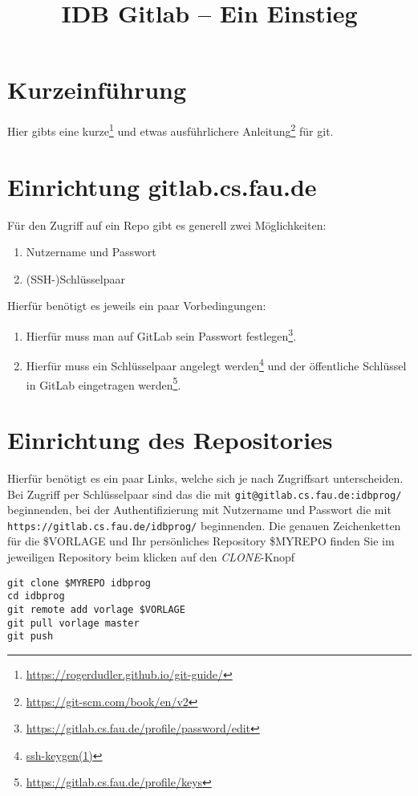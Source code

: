 \documentclass[10pt,a4paper]{article}
\begin{document}
\title{IDB Gitlab -- Ein Einstieg}
\date{}
\maketitle
\section{Kurzeinführung}
Hier gibts eine kurze\footnote{\url{https://rogerdudler.github.io/git-guide/}}
und etwas ausführlichere Anleitung\footnote{\url{https://git-scm.com/book/en/v2}}
für git.
\section{Einrichtung gitlab.cs.fau.de}
Für den Zugriff auf ein Repo gibt es generell zwei Möglichkeiten:
\begin{enumerate}
\item Nutzername und Passwort
\item (SSH-)Schlüsselpaar
\end{enumerate}
Hierfür benötigt es jeweils ein paar Vorbedingungen:
\begin{enumerate}
\item Hierfür muss man auf GitLab sein Passwort festlegen\footnote{\url{https://gitlab.cs.fau.de/profile/password/edit}}.
\item Hierfür muss ein Schlüsselpaar angelegt werden\footnote{\href{https://linux.die.net/man/1/ssh-keygen}{ssh-keygen(1)}} und der öffentliche Schlüssel in GitLab eingetragen werden\footnote{\url{https://gitlab.cs.fau.de/profile/keys}}.
\end{enumerate}
\section{Einrichtung des Repositories}
Hierfür benötigt es ein paar Links, welche sich je nach Zugriffsart unterscheiden. Bei Zugriff per Schlüsselpaar sind das die mit \lstinline|git@gitlab.cs.fau.de:idbprog/| beginnenden, bei der Authentifizierung mit Nutzername und Passwort die mit \lstinline|https://gitlab.cs.fau.de/idbprog/| beginnenden.
Die genauen Zeichenketten für die \$VORLAGE und Ihr persönliches Repository \$MYREPO finden Sie im jeweiligen Repository beim klicken auf den \textit{CLONE}-Knopf
\begin{lstlisting}
git clone $MYREPO idbprog
cd idbprog
git remote add vorlage $VORLAGE
git pull vorlage master
git push
\end{lstlisting}
\end{document}
